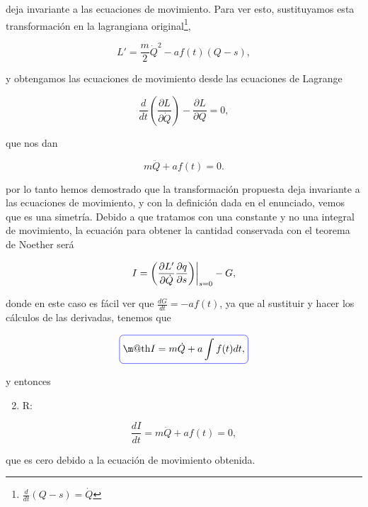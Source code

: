 \documentclass[a4paper,10pt]{article}
\makeatletter
\numberwithin{equation}{section}
\newcommand{\zerodel}{.\kern-\nulldelimiterspace}
\newcommand*{\boxcolor}{blue}
\renewcommand{\boxed}[1]{\textcolor{\boxcolor}{%
\tikz[baseline={([yshift=-1ex]current bounding box.center)}] \node [rectangle, minimum width=1ex,rounded corners,draw] {\normalcolor\m@th$\displaystyle#1$};}}
\makeatother
\begin{document}
deja invariante a las ecuaciones de movimiento. Para ver esto, sustituyamos esta 
transformación en la lagrangiana original\footnote{$\frac{d}{dt}(Q -s) = \dot{Q}$},

\begin{equation}
 L' = \frac{m}{2}\dot{Q}^2 - af(t)(Q-s),
\end{equation}

y obtengamos las ecuaciones de movimiento desde las ecuaciones de Lagrange

\begin{equation}
 \frac{d}{dt}\left(\frac{\partial L}{\partial \dot{Q}}\right) 
 - \frac{\partial L}{\partial Q} = 0,
\end{equation}

que nos dan

\begin{equation}
 m\ddot{Q} + af(t) = 0.
\end{equation}

por lo tanto hemos demostrado que la transformación propuesta deja invariante a las 
ecuaciones de movimiento, y con la definición dada en el enunciado, vemos que es 
una simetría. Debido a que tratamos con una constante y no una integral de movimiento, 
la ecuación para obtener la cantidad conservada con el teorema de Noether será 

\begin{equation}
 I = \left(\left\zerodel\frac{\partial L'}{\partial \dot{Q}}
 \frac{\partial q}{\partial s}\right)\right|_{s=0} - G,
\end{equation}

donde en este caso es fácil ver que $\frac{dG}{dt} = - af(t)$, ya que al sustituir 
y hacer los cálculos de las derivadas, tenemos que 

\begin{equation}
 \boxed{I = m\dot{Q} + a\int f(t) dt,}
\end{equation}

y entonces 

\begin{enumerate}[label=\alph*)]
\setcounter{enumi}{1}
 \item R:
\end{enumerate}

\begin{equation}
 \frac{dI}{dt} = m\ddot{Q} + af(t) = 0,
\end{equation}

que es cero debido a la ecuación de movimiento obtenida.
\end{document}
